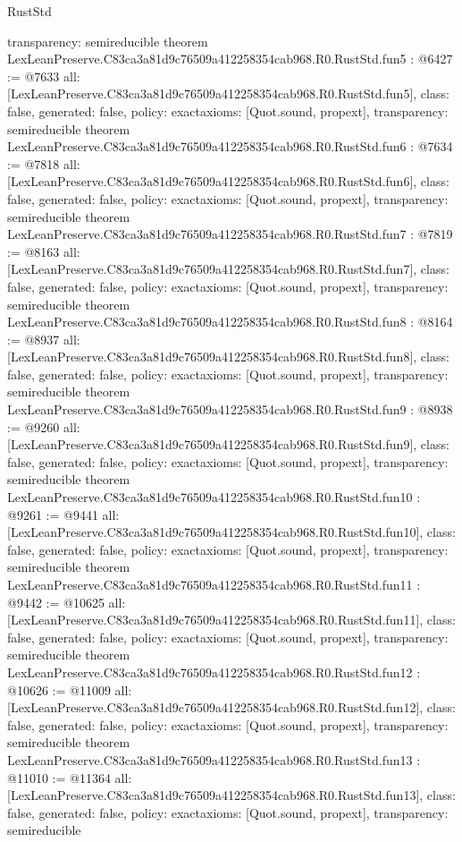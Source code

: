 \begin{lexlean}{RustStd}
\begin{coremodule}
{  transparency: semireducible
}
theorem LexLeanPreserve.C83ca3a81d9c76509a412258354cab968.R0.RustStd.fun5 : @6427 := @7633 {
  all: [LexLeanPreserve.C83ca3a81d9c76509a412258354cab968.R0.RustStd.fun5],
  class: false,
  generated: false,
  policy: exact{axioms: [Quot.sound, propext]},
  transparency: semireducible
}
theorem LexLeanPreserve.C83ca3a81d9c76509a412258354cab968.R0.RustStd.fun6 : @7634 := @7818 {
  all: [LexLeanPreserve.C83ca3a81d9c76509a412258354cab968.R0.RustStd.fun6],
  class: false,
  generated: false,
  policy: exact{axioms: [Quot.sound, propext]},
  transparency: semireducible
}
theorem LexLeanPreserve.C83ca3a81d9c76509a412258354cab968.R0.RustStd.fun7 : @7819 := @8163 {
  all: [LexLeanPreserve.C83ca3a81d9c76509a412258354cab968.R0.RustStd.fun7],
  class: false,
  generated: false,
  policy: exact{axioms: [Quot.sound, propext]},
  transparency: semireducible
}
theorem LexLeanPreserve.C83ca3a81d9c76509a412258354cab968.R0.RustStd.fun8 : @8164 := @8937 {
  all: [LexLeanPreserve.C83ca3a81d9c76509a412258354cab968.R0.RustStd.fun8],
  class: false,
  generated: false,
  policy: exact{axioms: [Quot.sound, propext]},
  transparency: semireducible
}
theorem LexLeanPreserve.C83ca3a81d9c76509a412258354cab968.R0.RustStd.fun9 : @8938 := @9260 {
  all: [LexLeanPreserve.C83ca3a81d9c76509a412258354cab968.R0.RustStd.fun9],
  class: false,
  generated: false,
  policy: exact{axioms: [Quot.sound, propext]},
  transparency: semireducible
}
theorem LexLeanPreserve.C83ca3a81d9c76509a412258354cab968.R0.RustStd.fun10 : @9261 := @9441 {
  all: [LexLeanPreserve.C83ca3a81d9c76509a412258354cab968.R0.RustStd.fun10],
  class: false,
  generated: false,
  policy: exact{axioms: [Quot.sound, propext]},
  transparency: semireducible
}
theorem LexLeanPreserve.C83ca3a81d9c76509a412258354cab968.R0.RustStd.fun11 : @9442 := @10625 {
  all: [LexLeanPreserve.C83ca3a81d9c76509a412258354cab968.R0.RustStd.fun11],
  class: false,
  generated: false,
  policy: exact{axioms: [Quot.sound, propext]},
  transparency: semireducible
}
theorem LexLeanPreserve.C83ca3a81d9c76509a412258354cab968.R0.RustStd.fun12 : @10626 := @11009 {
  all: [LexLeanPreserve.C83ca3a81d9c76509a412258354cab968.R0.RustStd.fun12],
  class: false,
  generated: false,
  policy: exact{axioms: [Quot.sound, propext]},
  transparency: semireducible
}
theorem LexLeanPreserve.C83ca3a81d9c76509a412258354cab968.R0.RustStd.fun13 : @11010 := @11364 {
  all: [LexLeanPreserve.C83ca3a81d9c76509a412258354cab968.R0.RustStd.fun13],
  class: false,
  generated: false,
  policy: exact{axioms: [Quot.sound, propext]},
  transparency: semireducible
}
\end{coremodule}
\end{lexlean}
